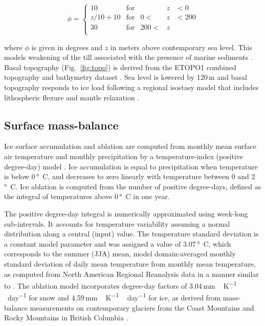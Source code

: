 \begin{equation}
	\phi = \left\{\begin{array}{llrll}
		10      & \mathrm{for} &      &z&<  0 \\
		z/10+10 & \mathrm{for} &   0 <&z&<200 \\
		30      & \mathrm{for} & 200 <&z&     \\
	\end{array}\right.
\end{equation}

where $\phi$ is given in degrees and $z$ in meters above contemporary sea level. This models weakening of the till associated with the presence of marine sediments \citep{martin-etal-2011,aschwanden-etal-2013}. Basal topography (Fig.~\ref{fig:topo}) is derived from the ETOPO1 combined topography and bathymetry dataset \citep{data:etopo1}. Sea level is lowered by 120\,m and basal topography responds to ice load following a regional isostasy model that includes lithospheric flexure and mantle relaxation \citep{lingle-clark-1985}.


\subsection{Surface mass-balance}

Ice surface accumulation and ablation are computed from monthly mean surface air temperature and monthly precipitation by a temperature-index (positive degree-day) model \citep{hock-2003}. Ice accumulation is equal to precipitation when temperature is below 0\,\unit{\degree C}, and decreases to zero linearly with temperature between 0 and 2\,\unit{\degree C}. Ice ablation is computed from the number of positive degree-days, defined as the integral of temperatures above 0\,\unit{\degree C} in one year. 

The positive degree-day integral \citep{calov-greve-2005} is numerically approximated using week-long sub-intervals. It accounts for temperature variability assuming a normal distribution along a central (input) value. The temperature standard deviation is a constant model parameter and was assigned a value of 3.07\,\unit{\degree C}, which corresponds to the summer (JJA) mean, model domain-averaged monthly standard deviation of daily mean temperature from monthly mean temperature, as computed from North American Regional Reanalysis data \citep{data:narr} in a manner similar to \citet{seguinot-inreview}. The ablation model incorporates degree-day factors of 3.04\,\unit{mm\,K^{-1}\,day^{-1}} for snow and 4.59\,\unit{mm\,K^{-1}\,day^{-1}} for ice, as derived from mass-balance measurements on contemporary glaciers from the Coast Mountains and Rocky Mountains in British Columbia \citep{shea-etal-2009}.

